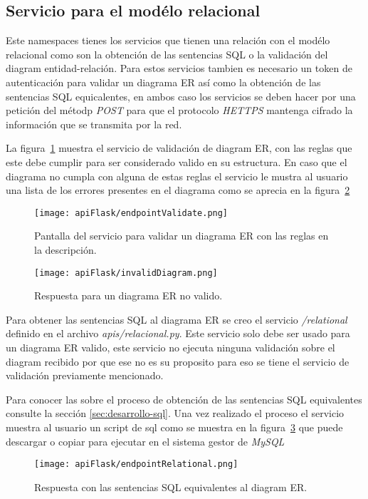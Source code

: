\subsection{Servicio para el modélo relacional}

Este namespaces tienes los servicios que tienen una relación con el modélo relacional como son la obtención de las sentencias SQL o la validación del diagram entidad-relación. Para estos servicios tambien es necesario un token de autenticación para validar un diagrama ER así como la obtención de las sentencias SQL equicalentes, en ambos caso los servicios se deben hacer por una petición del métodp \textit{POST} para que el protocolo \textit{HETTPS} mantenga cifrado la información que se transmita por la red.

La figura~\ref{img:validateER} muestra el servicio de validación de diagram ER, con las reglas que este debe cumplir para ser considerado valido en su estructura. En caso que el diagrama no cumpla con alguna de estas reglas el servicio le mustra al usuario una lista de los errores presentes en el diagrama como se aprecia en la figura~\ref{img:invalidDiagram}

\begin{figure}[H]
  \centering
  \texttt{[image: apiFlask/endpointValidate.png]}
  \caption{Pantalla del servicio para validar un diagrama ER con las reglas en la descripción.}
  \label{img:validateER}
\end{figure}

\begin{figure}[H]
  \centering
  \texttt{[image: apiFlask/invalidDiagram.png]}
  \caption{Respuesta para un diagrama ER no valido.}
  \label{img:invalidDiagram}
\end{figure}

Para obtener las sentencias SQL al diagrama ER se creo el servicio \textit{/relational} definido en el archivo \textit{apis/relacional.py}. Este servicio solo debe ser usado para un diagrama ER valido, este servicio no ejecuta ninguna validación sobre el diagram recibido por que ese no es su proposito para eso se tiene el servicio de validación previamente mencionado.

Para conocer las sobre el proceso de obtención de las sentencias SQL equivalentes consulte la sección \ref{sec:desarrollo-sql}. Una vez realizado el proceso el servicio muestra al usuario un script de sql como se muestra en la figura~\ref{img:sqlSentences} que puede descargar o copiar para ejecutar en el sistema gestor de \textit{MySQL}


\begin{figure}[H]
  \centering
  \texttt{[image: apiFlask/endpointRelational.png]}
  \caption{Respuesta con las sentencias SQL equivalentes al diagram ER.}
  \label{img:sqlSentences}
\end{figure}